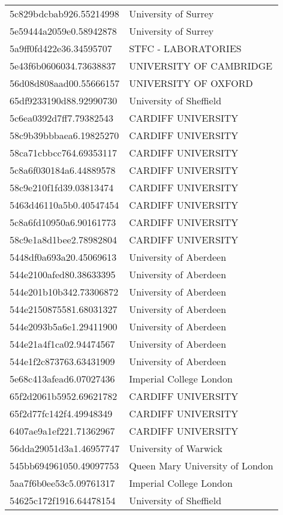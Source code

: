 \begin{tabular}{ll}
5c829bdcbab926.55214998 & University of Surrey \\
5e59444a2059e0.58942878 & University of Surrey \\
5a9ff0fd422e36.34595707 & STFC - LABORATORIES \\
5e43f6b0606034.73638837 & UNIVERSITY OF CAMBRIDGE \\
56d08d808aad00.55666157 & UNIVERSITY OF OXFORD \\
65df9233190d88.92990730 & University of Sheffield \\
5c6ea0392d7ff7.79382543 & CARDIFF UNIVERSITY \\
58c9b39bbbaea6.19825270 & CARDIFF UNIVERSITY \\
58ca71cbbcc764.69353117 & CARDIFF UNIVERSITY \\
5c8a6f030184a6.44889578 & CARDIFF UNIVERSITY \\
58c9e210f1fd39.03813474 & CARDIFF UNIVERSITY \\
5463d46110a5b0.40547454 & CARDIFF UNIVERSITY \\
5c8a6fd10950a6.90161773 & CARDIFF UNIVERSITY \\
58c9e1a8d1bee2.78982804 & CARDIFF UNIVERSITY \\
5448df0a693a20.45069613 & University of Aberdeen \\
544e2100afed80.38633395 & University of Aberdeen \\
544e201b10b342.73306872 & University of Aberdeen \\
544e2150875581.68031327 & University of Aberdeen \\
544e2093b5a6e1.29411900 & University of Aberdeen \\
544e21a4f1ca02.94474567 & University of Aberdeen \\
544e1f2c873763.63431909 & University of Aberdeen \\
5e68c413afead6.07027436 & Imperial College London \\
65f2d2061b5952.69621782 & CARDIFF UNIVERSITY \\
65f2d77fc142f4.49948349 & CARDIFF UNIVERSITY \\
6407ae9a1ef221.71362967 & CARDIFF UNIVERSITY \\
56dda29051d3a1.46957747 & University of Warwick \\
545bb694961050.49097753 & Queen Mary University of London \\
5aa7f6b0ee53c5.09761317 & Imperial College London \\
54625c172f1916.64478154 & University of Sheffield \\

\end{tabular}
